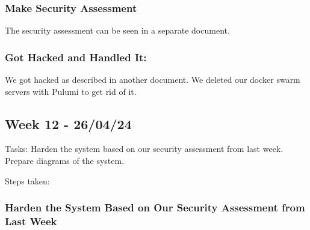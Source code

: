 \subsubsection{Make Security Assessment}
\label{log:make-security-assessment}

The security assessment can be seen in a separate document.

\subsubsection{Got Hacked and Handled It:}
\label{log:got-hacked-and-handled-it}

We got hacked as described in another document. We deleted our docker
swarm servers with Pulumi to get rid of it.

\subsection{Week 12 - 26/04/24}
\label{week12}

Tasks: Harden the system based on our security assessment from last week. Prepare diagrams of the system.

Steps taken:

\subsubsection{Harden the System Based on Our Security Assessment from Last Week}
\label{log:harden-the-system-based-on-our-security-assessment-from-last-week}

